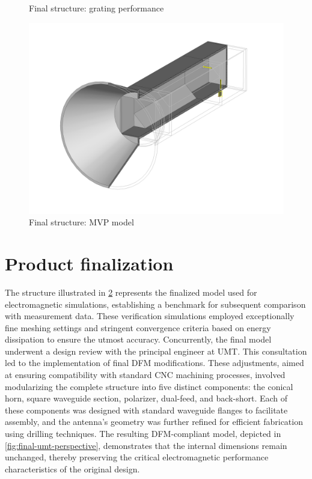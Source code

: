 \documentclass[11pt,a4paper,twoside,openany]{report}
\begin{document}
\begin{figure}[!ht]
    \centering
    
    \caption{\label{fig:grating-vs-mvp-sparameters}Final structure: grating performance}
\end{figure}

%     

\begin{figure}[!ht]
    \centering
    \includegraphics[width=.9\textwidth]{src/final_perspective.png}
    \caption{\label{fig:final-perspective}Final structure: MVP model}
\end{figure}

\section{Product finalization}
The structure illustrated in \cref{fig:final-perspective} represents the finalized model used for electromagnetic simulations, establishing a benchmark for subsequent comparison with measurement data. These verification simulations employed exceptionally fine meshing settings and stringent convergence criteria based on energy dissipation to ensure the utmost accuracy. Concurrently, the final model underwent a design review with the principal engineer at UMT. This consultation led to the implementation of final DFM modifications. These adjustments, aimed at ensuring compatibility with standard CNC machining processes, involved modularizing the complete structure into five distinct components: the conical horn, square waveguide section, polarizer, dual-feed, and back-short. Each of these components was designed with standard waveguide flanges to facilitate assembly, and the antenna's geometry was further refined for efficient fabrication using drilling techniques. The resulting DFM-compliant model, depicted in \cref{fig:final-umt-perspective}, demonstrates that the internal dimensions remain unchanged, thereby preserving the critical electromagnetic performance characteristics of the original design.
\end{document}
